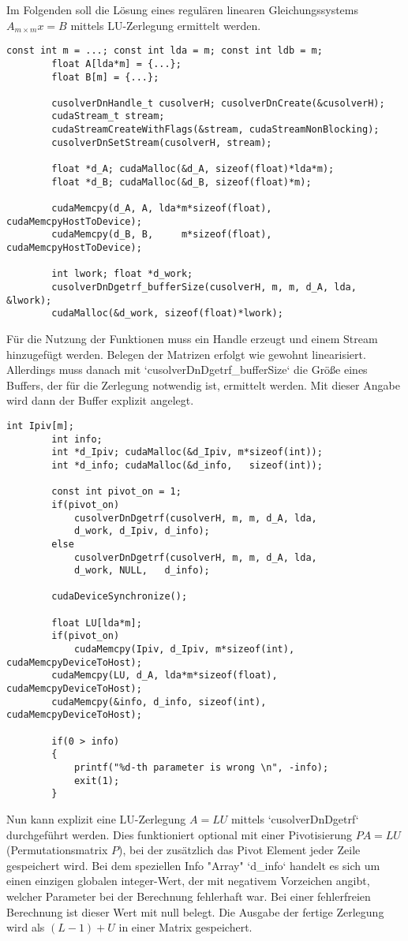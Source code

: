 		Im Folgenden soll die Lösung eines regulären linearen Gleichungssystems $A_{m\times m}x=B$ mittels LU-Zerlegung ermittelt werden.
		\begin{lstlisting}[caption=cuSOLVER: Buffer]
		const int m = ...; const int lda = m; const int ldb = m;
		float A[lda*m] = {...};
		float B[m] = {...};    

		cusolverDnHandle_t cusolverH; cusolverDnCreate(&cusolverH);
		cudaStream_t stream;
		cudaStreamCreateWithFlags(&stream, cudaStreamNonBlocking);
		cusolverDnSetStream(cusolverH, stream);

		float *d_A; cudaMalloc(&d_A, sizeof(float)*lda*m);
		float *d_B; cudaMalloc(&d_B, sizeof(float)*m);

		cudaMemcpy(d_A, A, lda*m*sizeof(float), cudaMemcpyHostToDevice);
		cudaMemcpy(d_B, B,     m*sizeof(float), cudaMemcpyHostToDevice);

		int lwork; float *d_work; 
		cusolverDnDgetrf_bufferSize(cusolverH, m, m, d_A, lda, &lwork);
		cudaMalloc(&d_work, sizeof(float)*lwork);
		\end{lstlisting}
		
		Für die Nutzung der Funktionen muss ein \Gls{Handle} erzeugt und einem \Gls{Stream} hinzugefügt werden. Belegen der Matrizen erfolgt wie gewohnt linearisiert. Allerdings muss danach mit \li`cusolverDnDgetrf_bufferSize` die Größe eines Buffers, der für die Zerlegung notwendig ist, ermittelt werden. Mit dieser Angabe wird dann der Buffer explizit angelegt.
		\begin{lstlisting}[caption=cuSOLVER: LU-Zerlegung]
		int Ipiv[m];      
		int info; 
		int *d_Ipiv; cudaMalloc(&d_Ipiv, m*sizeof(int));
		int *d_info; cudaMalloc(&d_info,   sizeof(int));
		
		const int pivot_on = 1;
		if(pivot_on) 
			cusolverDnDgetrf(cusolverH, m, m, d_A, lda, 
			d_work, d_Ipiv, d_info);
		else          
			cusolverDnDgetrf(cusolverH, m, m, d_A, lda, 
			d_work, NULL,   d_info);
			
		cudaDeviceSynchronize();

		float LU[lda*m];
		if(pivot_on) 
			cudaMemcpy(Ipiv, d_Ipiv, m*sizeof(int), cudaMemcpyDeviceToHost);
		cudaMemcpy(LU, d_A, lda*m*sizeof(float), cudaMemcpyDeviceToHost);
		cudaMemcpy(&info, d_info, sizeof(int), cudaMemcpyDeviceToHost);

		if(0 > info)
		{	
			printf("%d-th parameter is wrong \n", -info);
			exit(1);
		}
		\end{lstlisting}
		
		Nun kann explizit eine LU-Zerlegung $A = LU$ mittels \li`cusolverDnDgetrf` durchgeführt werden. Dies funktioniert optional mit einer Pivotisierung $PA = LU$ (Permutationsmatrix $P$), bei der zusätzlich das Pivot Element jeder Zeile gespeichert wird. Bei dem speziellen Info "Array" \li`d_info` handelt es sich um einen einzigen globalen integer-Wert, der mit negativem Vorzeichen angibt, welcher Parameter bei der Berechnung fehlerhaft war. Bei einer fehlerfreien Berechnung ist dieser Wert mit null belegt. Die Ausgabe der fertige Zerlegung wird als $(L-1)+U$ in einer Matrix gespeichert.
		

